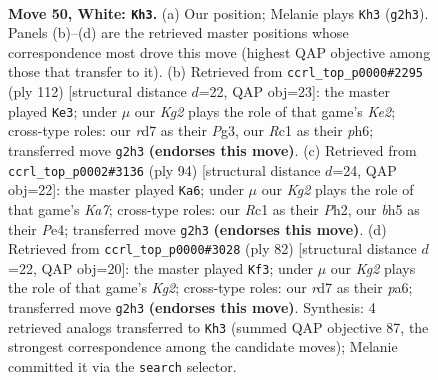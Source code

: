 \documentclass[11pt]{article}
\begin{document}
\clearpage

\begin{figure}[p]\centering
\begin{subfigure}{0.46\textwidth}\centering
\resizebox{\linewidth}{!}{%
\newchessgame
\chessboard[
  setfen={5k2/3r4/p1n2P2/7b/1P6/2B5/P5K1/2R5 w - - 5 50},
  showmover=false,
  pgfstyle=straightmove, color=movearrow, markmove={g2-h3}
]}
\caption{}
\end{subfigure}\hfill
\begin{subfigure}{0.46\textwidth}\centering
\resizebox{\linewidth}{!}{%
\newchessgame
\chessboard[
  setfen={8/8/7p/p1n1k3/8/1P4P1/2B1K2P/8 w - - 24 57},
  showmover=false,
  pgfstyle=straightmove, color=movearrow, markmove={e2-e3}
]}
\caption{}
\end{subfigure}
\\[4pt]
\begin{subfigure}{0.46\textwidth}\centering
\resizebox{\linewidth}{!}{%
\newchessgame
\chessboard[
  setfen={8/K1k5/8/4p1p1/P2nP3/5P1p/7P/3B4 w - - 4 48},
  showmover=false,
  pgfstyle=straightmove, color=movearrow, markmove={a7-a6}
]}
\caption{}
\end{subfigure}\hfill
\begin{subfigure}{0.46\textwidth}\centering
\resizebox{\linewidth}{!}{%
\newchessgame
\chessboard[
  setfen={8/3B1pk1/p1PB4/P2n4/5P2/8/6K1/2r5 w - - 1 42},
  showmover=false,
  pgfstyle=straightmove, color=movearrow, markmove={g2-f3}
]}
\caption{}
\end{subfigure}
\caption{\textbf{Move 50, White: \texttt{Kh3}.} (a) Our position; Melanie plays \texttt{Kh3} (\texttt{g2h3}). Panels (b)--(d) are the retrieved master positions whose correspondence most drove this move (highest QAP objective among those that transfer to it). (b) Retrieved from \texttt{ccrl\_top\_p0000\#2295} (ply 112) [structural distance $d$=22, QAP obj=23]: the master played \texttt{Ke3}; under $\mu$ our \emph{Kg2} plays the role of that game's \emph{Ke2}; cross-type roles: our \emph{r}d7 as their \emph{P}g3, our \emph{R}c1 as their \emph{p}h6; transferred move \texttt{g2h3} \textbf{(endorses this move)}. (c) Retrieved from \texttt{ccrl\_top\_p0002\#3136} (ply 94) [structural distance $d$=24, QAP obj=22]: the master played \texttt{Ka6}; under $\mu$ our \emph{Kg2} plays the role of that game's \emph{Ka7}; cross-type roles: our \emph{R}c1 as their \emph{P}h2, our \emph{b}h5 as their \emph{P}e4; transferred move \texttt{g2h3} \textbf{(endorses this move)}. (d) Retrieved from \texttt{ccrl\_top\_p0000\#3028} (ply 82) [structural distance $d$=22, QAP obj=20]: the master played \texttt{Kf3}; under $\mu$ our \emph{Kg2} plays the role of that game's \emph{Kg2}; cross-type roles: our \emph{r}d7 as their \emph{p}a6; transferred move \texttt{g2h3} \textbf{(endorses this move)}. Synthesis: 4 retrieved analogs transferred to \texttt{Kh3} (summed QAP objective 87, the strongest correspondence among the candidate moves); Melanie committed it via the \texttt{search} selector.}
\label{fig:thought-m98}
\end{figure}
\end{document}
